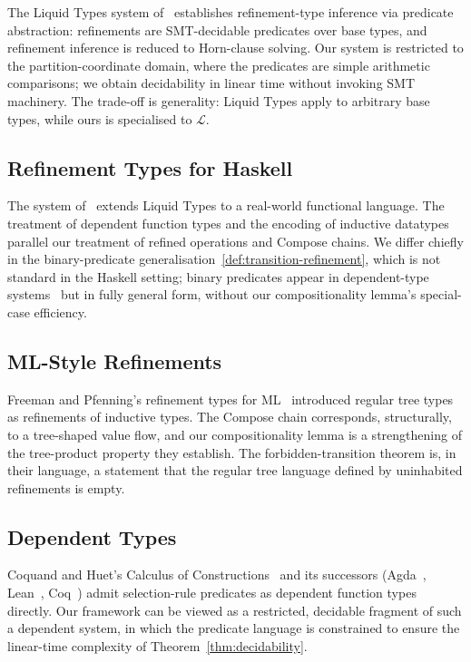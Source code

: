 \documentclass[twocolumn,11pt,a4paper]{article}
\newcommand{\Lab}{\mathcal{L}}
\begin{document}
The Liquid Types system of~\citet{rondon2008liquid} establishes refinement-type inference via predicate abstraction: refinements are SMT-decidable predicates over base types, and refinement inference is reduced to Horn-clause solving. Our system is restricted to the partition-coordinate domain, where the predicates are simple arithmetic comparisons; we obtain decidability in linear time without invoking SMT machinery. The trade-off is generality: Liquid Types apply to arbitrary base types, while ours is specialised to $\Lab$.

\subsection{Refinement Types for Haskell}

The system of~\citet{vazou2014refinement} extends Liquid Types to a real-world functional language. The treatment of dependent function types and the encoding of inductive datatypes parallel our treatment of refined operations and Compose chains. We differ chiefly in the binary-predicate generalisation~\eqref{def:transition-refinement}, which is not standard in the Haskell setting; binary predicates appear in dependent-type systems~\citep{coquand1988calculus,norell2007agda} but in fully general form, without our compositionality lemma's special-case efficiency.

\subsection{ML-Style Refinements}

Freeman and Pfenning's refinement types for ML~\citep{freeman1991refinement} introduced regular tree types as refinements of inductive types. The Compose chain corresponds, structurally, to a tree-shaped value flow, and our compositionality lemma is a strengthening of the tree-product property they establish. The forbidden-transition theorem is, in their language, a statement that the regular tree language defined by uninhabited refinements is empty.

\subsection{Dependent Types}

Coquand and Huet's Calculus of Constructions~\citep{coquand1988calculus} and its successors (Agda~\citep{norell2007agda}, Lean~\citep{demoura2015lean}, Coq~\citep{bertot2004interactive}) admit selection-rule predicates as dependent function types directly. Our framework can be viewed as a restricted, decidable fragment of such a dependent system, in which the predicate language is constrained to ensure the linear-time complexity of Theorem~\ref{thm:decidability}.
\end{document}
